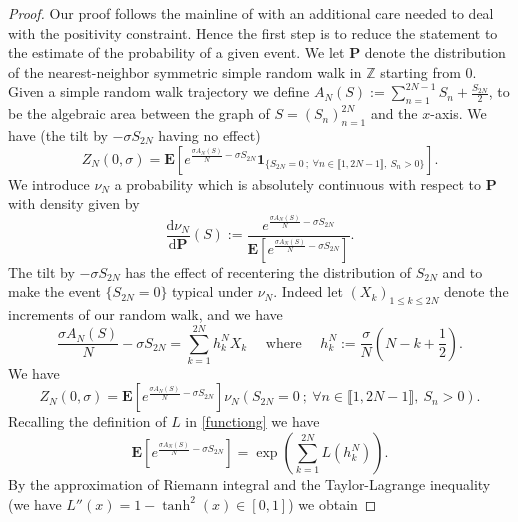 \documentclass[reqno,11pt]{amsart}
\numberwithin{equation}{section}
\newcommand{\bbZ}{{\ensuremath{\mathbb Z}} }
\newcommand{\bP}{{\ensuremath{\mathbf P}} }
\newcommand{\bE}{{\ensuremath{\mathbf E}} }
\newcommand{\ind}{\mathbf{1}}
\newcommand{\lint}{\llbracket}
\newcommand{\rint}{\rrbracket}
\newcommand{\dd}{\mathrm{d}}
\begin{document}
\medskip


\begin{proof}
Our proof follows the mainline of \cite[Proposition 3]{LabbeWABridge} with an 
additional care needed to deal with the positivity constraint.
Hence the first step is to reduce the statement to the estimate of the probability  of a given event.
We let $\bP$ denote the distribution of the nearest-neighbor symmetric simple random walk in $\bbZ$ starting from $0$. Given a simple random walk trajectory we define $A_N(S):= \sum_{n=1}^{2N-1} S_n +\frac{S_{2N}}{2}$, to be the algebraic area between the graph of $S=(S_n)^{2N}_{n=1}$  and the $x$-axis.
We have (the tilt by $-\sigma S_{2N}$ having no effect)
\begin{equation}
 Z_N(0,\sigma)= \bE\left[ e^{\frac{\sigma A_N(S)}{N}-\sigma S_{2N}} \ind_{\{S_{2N}=0 \ ; \ \forall n\in \lint 1,2N-1\rint, \ S_{n}>0 \}}\right].\label{recenterarea}
\end{equation}
We introduce $\nu_N$ a probability which is absolutely continuous with respect to $\bP$ with density given by
\begin{equation}\label{defNu}
 \frac{\dd \nu_N}{\dd \bP}(S):= \frac{e^{\frac{\sigma A_N(S)}{N}-\sigma S_{2N}}}{\bE\left[ e^{\frac{\sigma A_N(S)}{N}-\sigma S_{2N}}\right]}.
\end{equation}
The tilt by $-\sigma S_{2N}$ has the effect of recentering the distribution of $S_{2N}$ and to make the event  $\{S_{2N}=0\}$ typical under $\nu_N$.
Indeed let $(X_k)_{1 \leq k\leq 2N}$ denote the increments of our random walk, and
we have 
\begin{equation}\label{incrementNu}
 \frac{\sigma A_N(S)}{N}- \sigma S_{2N}=\sum_{k=1}^{2N}h^N_k X_k \quad  \text{ where } \quad h^N_k:=\frac{\sigma}{N}\left(N-k+\frac{1}{2}\right).
\end{equation}
We have 
\begin{equation}\label{partfunzeropinning}
  Z_N(0,\sigma)= \bE\left[ e^{\frac{\sigma A_N(S)}{N}-\sigma S_{2N}}\right]\nu_{N}\left( S_{2N}=0 \ ; \ \forall n\in \lint 1,2N-1\rint, \ S_{n}>0  \right).
\end{equation}
Recalling the definition of $L$ in \eqref{functiong} we have
\begin{equation}
 \bE\left[ e^{\frac{\sigma A_N(S)}{N}-\sigma S_{2N}}\right]
 =\exp\left( \sum^{2N}_{k=1} L(h^N_k) \right).\label{discreteareaenergy}
\end{equation}
By the approximation of Riemann integral  and the Taylor-Lagrange inequality
(we have $L''(x)=1-\tanh^2(x) \in [0,1]$) we obtain

\end{proof}
\end{document}
